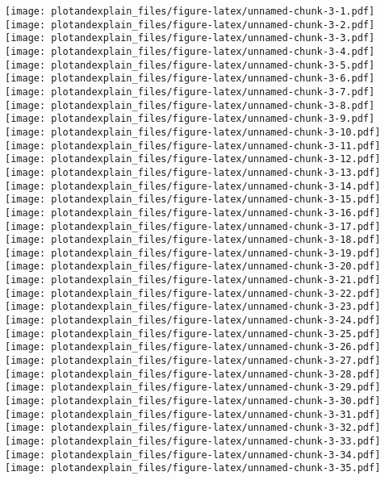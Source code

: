 \documentclass[]{article}
\begin{document}
\texttt{[image: plotandexplain\_files/figure-latex/unnamed-chunk-3-1.pdf]}
\texttt{[image: plotandexplain\_files/figure-latex/unnamed-chunk-3-2.pdf]}
\texttt{[image: plotandexplain\_files/figure-latex/unnamed-chunk-3-3.pdf]}
\texttt{[image: plotandexplain\_files/figure-latex/unnamed-chunk-3-4.pdf]}
\texttt{[image: plotandexplain\_files/figure-latex/unnamed-chunk-3-5.pdf]}
\texttt{[image: plotandexplain\_files/figure-latex/unnamed-chunk-3-6.pdf]}
\texttt{[image: plotandexplain\_files/figure-latex/unnamed-chunk-3-7.pdf]}
\texttt{[image: plotandexplain\_files/figure-latex/unnamed-chunk-3-8.pdf]}
\texttt{[image: plotandexplain\_files/figure-latex/unnamed-chunk-3-9.pdf]}
\texttt{[image: plotandexplain\_files/figure-latex/unnamed-chunk-3-10.pdf]}
\texttt{[image: plotandexplain\_files/figure-latex/unnamed-chunk-3-11.pdf]}
\texttt{[image: plotandexplain\_files/figure-latex/unnamed-chunk-3-12.pdf]}
\texttt{[image: plotandexplain\_files/figure-latex/unnamed-chunk-3-13.pdf]}
\texttt{[image: plotandexplain\_files/figure-latex/unnamed-chunk-3-14.pdf]}
\texttt{[image: plotandexplain\_files/figure-latex/unnamed-chunk-3-15.pdf]}
\texttt{[image: plotandexplain\_files/figure-latex/unnamed-chunk-3-16.pdf]}
\texttt{[image: plotandexplain\_files/figure-latex/unnamed-chunk-3-17.pdf]}
\texttt{[image: plotandexplain\_files/figure-latex/unnamed-chunk-3-18.pdf]}
\texttt{[image: plotandexplain\_files/figure-latex/unnamed-chunk-3-19.pdf]}
\texttt{[image: plotandexplain\_files/figure-latex/unnamed-chunk-3-20.pdf]}
\texttt{[image: plotandexplain\_files/figure-latex/unnamed-chunk-3-21.pdf]}
\texttt{[image: plotandexplain\_files/figure-latex/unnamed-chunk-3-22.pdf]}
\texttt{[image: plotandexplain\_files/figure-latex/unnamed-chunk-3-23.pdf]}
\texttt{[image: plotandexplain\_files/figure-latex/unnamed-chunk-3-24.pdf]}
\texttt{[image: plotandexplain\_files/figure-latex/unnamed-chunk-3-25.pdf]}
\texttt{[image: plotandexplain\_files/figure-latex/unnamed-chunk-3-26.pdf]}
\texttt{[image: plotandexplain\_files/figure-latex/unnamed-chunk-3-27.pdf]}
\texttt{[image: plotandexplain\_files/figure-latex/unnamed-chunk-3-28.pdf]}
\texttt{[image: plotandexplain\_files/figure-latex/unnamed-chunk-3-29.pdf]}
\texttt{[image: plotandexplain\_files/figure-latex/unnamed-chunk-3-30.pdf]}
\texttt{[image: plotandexplain\_files/figure-latex/unnamed-chunk-3-31.pdf]}
\texttt{[image: plotandexplain\_files/figure-latex/unnamed-chunk-3-32.pdf]}
\texttt{[image: plotandexplain\_files/figure-latex/unnamed-chunk-3-33.pdf]}
\texttt{[image: plotandexplain\_files/figure-latex/unnamed-chunk-3-34.pdf]}
\texttt{[image: plotandexplain\_files/figure-latex/unnamed-chunk-3-35.pdf]}
\end{document}
